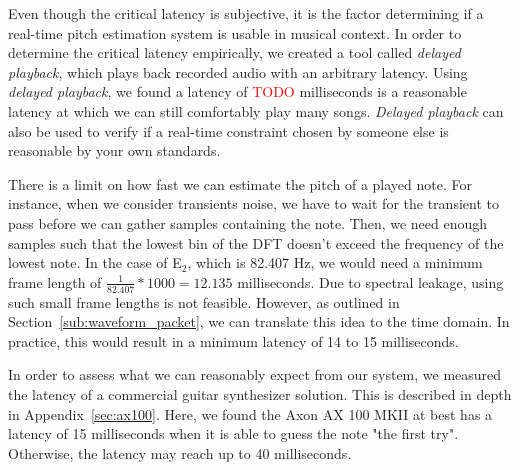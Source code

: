 \documentclass[a4paper,10pt,twocolumn]{article}
\newcommand{\note}[2]{#1${}_{#2}$}
\begin{document}
Even though the critical latency is subjective, it is the factor determining if a real-time pitch estimation system is usable in musical context. In order to determine the critical latency empirically, we created a tool called \textit{delayed playback}, which plays back recorded audio with an arbitrary latency. Using \textit{delayed playback}, we found a latency of \textcolor{red}{TODO} milliseconds is a reasonable latency at which we can still comfortably play many songs. \textit{Delayed playback} can also be used to verify if a real-time constraint chosen by someone else is reasonable by your own standards.%


There is a limit on how fast we can estimate the pitch of a played note. For instance, when we consider transients noise, we have to wait for the transient to pass before we can gather samples containing the note. Then, we need enough samples such that the lowest bin of the DFT doesn't exceed the frequency of the lowest note. In the case of \note{E}{2}, which is 82.407 Hz, we would need a minimum frame length of $ \frac{1}{82.407} * 1000 = 12.135 $ milliseconds. Due to spectral leakage, using such small frame lengths is not feasible. However, as outlined in Section~\ref{sub:waveform_packet}, we can translate this idea to the time domain. In practice, this would result in a minimum latency of 14 to 15 milliseconds.

In order to assess what we can reasonably expect from our system, we measured the latency of a commercial guitar synthesizer solution. This is described in depth in Appendix~\ref{sec:ax100}. Here, we found the Axon AX 100 MKII at best has a latency of 15 milliseconds when it is able to guess the note "the first try". Otherwise, the latency may reach up to 40 milliseconds.
\end{document}

